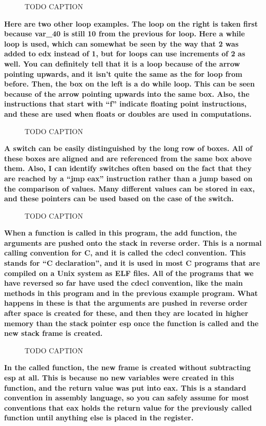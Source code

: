 \documentclass[letterpaper]{article}
\newcommand{\sitfig}[3]{
\begin{figure}[H]
\centering
\makebox[\textwidth][c]{
#2
}
\caption{#3}
\label{#1}
\end{figure}
}
\newcommand{\sitgfx}[4][scale=1.0]{
\sitfig{#3}{\texttt{[image: \#2]}}{#4}
}
\begin{document}
  
\sitgfx[width=6.5in,height=3.9374in]{FINALWORKINGDOCFORMERLYPRECURSOR-img068.png}{fig:unk}{TODO CAPTION}
 

\textbf{Here are two other loop examples. The loop on the right is taken first because var\_40 is still 10 from the
previous for loop. Here a while loop is used, which can somewhat be seen by the way that 2 was added to edx instead of
1, but for loops can use increments of 2 as well. You can definitely tell that it is a loop because of the arrow
pointing upwards, and it isn't quite the same as the for loop from before. Then, the box on the left is a do while
loop. This can be seen because of the arrow pointing upwards into the same box. Also, the instructions that start with 
{}``f'' indicate floating point instructions, and these are used when floats or doubles are used in computations.}

  
\sitgfx[width=6.4898in,height=0.6252in]{FINALWORKINGDOCFORMERLYPRECURSOR-img069.png}{fig:unk}{TODO CAPTION}
 

\textbf{A switch can be easily distinguished by the long row of boxes. All of these boxes are aligned and are referenced
from the same box above them. Also, I can identify switches often based on the fact that they are reached by a ``jmp
eax'' instruction rather than a jump based on the comparison of values. Many different values can be stored in eax, and
these pointers can be used based on the case of the switch.}

  
\sitgfx[width=2.8646in,height=1.2083in]{FINALWORKINGDOCFORMERLYPRECURSOR-img070.png}{fig:unk}{TODO CAPTION}
 

\textbf{When a function is called in this program, the add function, the arguments are pushed onto the stack in reverse
order. This is a normal calling convention for C, and it is called the cdecl convention. This stands for ``C
declaration'', and it is used in most C programs that are compiled on a Unix system as ELF files. All of the programs
that we have reversed so far have used the cdecl convention, like the main methods in this program and in the previous
example program. What happens in these is that the arguments are pushed in reverse order after space is created for
these, and then they are located in higher memory than the stack pointer esp once the function is called and the new
stack frame is created. }

  
\sitgfx[width=3.3646in,height=3.7602in]{FINALWORKINGDOCFORMERLYPRECURSOR-img071.png}{fig:unk}{TODO CAPTION}
 

\textbf{In the called function, the new frame is created without subtracting esp at all. This is because no new
variables were created in this function, and the return value was put into eax. This is a standard convention in
assembly language, so you can safely assume for most conventions that eax holds the return value for the previously
called function until anything else is placed in the register.}
\end{document}
